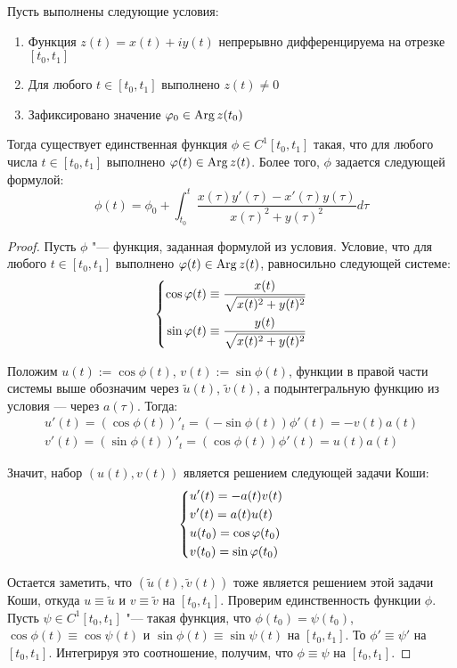 \begin{proposition}
	Пусть выполнены следующие условия:
	\begin{enumerate}
		\item Функция $z(t) = x(t) + iy(t)$ непрерывно дифференцируема на отрезке $[t_0, t_1]$
		\item Для любого $t \in [t_0, t_1]$ выполнено $z(t) \ne 0$
		\item Зафиксировано значение $\varphi_0 \in \operatorname{Arg}{z(t_0)}$
	\end{enumerate}

	Тогда существует единственная функция $\phi \in C^1[t_0, t_1]$ такая, что для любого числа $t \in [t_0, t_1]$ выполнено $\varphi(t) \in \operatorname{Arg} z(t)$. Более того, $\phi$ задается следующей формулой:
	\[\phi(t) = \phi_0 + \int_{t_0}^t\frac{x(\tau)y'(\tau) - x'(\tau)y(\tau)}{x(\tau)^2 + y(\tau)^2}d\tau\]
\end{proposition}

\begin{proof}
	Пусть $\phi$ "--- функция, заданная формулой из условия. Условие, что для любого $t \in [t_0, t_1]$ выполнено $\varphi(t) \in \operatorname{Arg} z(t)$, равносильно следующей системе:
	\[\left\{\begin{aligned}
		\cos\varphi(t) \equiv \frac{x(t)}{\sqrt{x(t)^2 + y(t)^2}} \\
		\sin\varphi(t) \equiv \frac{y(t)}{\sqrt{x(t)^2 + y(t)^2}}
	\end{aligned}\right.\]
	
	Положим $u(t) := \cos\phi(t)$, $v(t) := \sin\phi(t)$, функции в правой части системы выше обозначим через $\widetilde u(t)$, $\widetilde v(t)$, а подынтегральную функцию из условия --- через $a(\tau)$. Тогда:
	\begin{gather*}
		u'(t) = (\cos\phi(t))'_t = (-\sin\phi(t))\phi'(t) = -v(t)a(t)\\
		v'(t) = (\sin\phi(t))'_t = (\cos\phi(t))\phi'(t) = u(t)a(t)
	\end{gather*}
	
	Значит, набор $(u(t), v(t))$ является решением следующей задачи Коши:
	\[\left\{\begin{aligned}
	&u'(t) = -a(t)v(t)\\
	&v'(t) = a(t)u(t)\\
	&u(t_0) = \cos\varphi(t_0)\\
	&v(t_0) = \sin\varphi(t_0)\end{aligned}\right.\]
	
	Остается заметить, что $(\widetilde u(t), \widetilde v(t))$ тоже является решением этой задачи Коши, откуда $u \equiv \widetilde u$ и $v \equiv \widetilde v$ на $[t_0, t_1]$. Проверим единственность функции $\phi$. Пусть $\psi \in C^1[t_0, t_1]$ "--- такая функция, что $\phi(t_0) = \psi(t_0)$, $\cos\phi(t) \equiv \cos\psi(t)$ и $\sin\phi(t) \equiv \sin\psi(t)$ на $[t_0, t_1]$. То $\phi' \equiv \psi'$ на $[t_0, t_1]$. Интегрируя это соотношение, получим, что $\phi \equiv \psi$ на $[t_0, t_1]$.
\end{proof}

